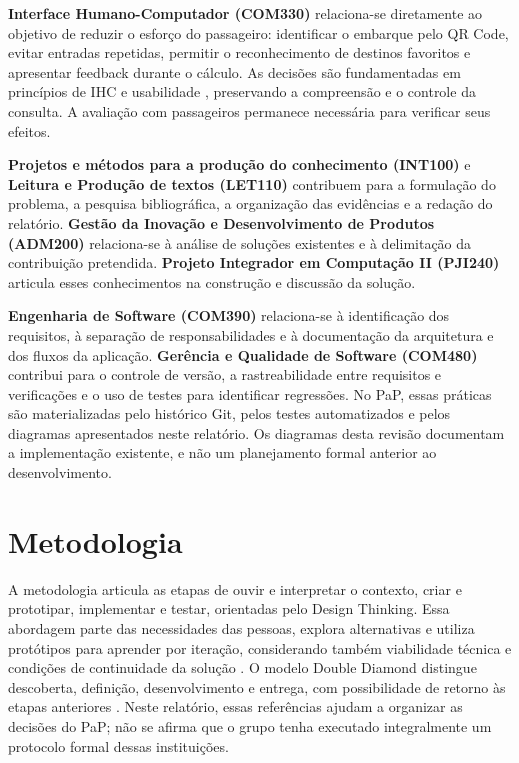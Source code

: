 \documentclass[12pt,oneside,a4paper,brazil,chapter=TITLE]{abntex2}
\let\papsection\section
\renewcommand{\section}{\clearpage\papsection}
\begin{document}
\textbf{Interface Humano-Computador (COM330)} relaciona-se diretamente ao objetivo de reduzir o esforço do passageiro: identificar o embarque pelo QR Code, evitar entradas repetidas, permitir o reconhecimento de destinos favoritos e apresentar feedback durante o cálculo. As decisões são fundamentadas em princípios de IHC e usabilidade \citep{barbosa2021,nielsen1994,iso924111}, preservando a compreensão e o controle da consulta. A avaliação com passageiros permanece necessária para verificar seus efeitos.

\textbf{Projetos e métodos para a produção do conhecimento (INT100)} e \textbf{Leitura e Produção de textos (LET110)} contribuem para a formulação do problema, a pesquisa bibliográfica, a organização das evidências e a redação do relatório. \textbf{Gestão da Inovação e Desenvolvimento de Produtos (ADM200)} relaciona-se à análise de soluções existentes e à delimitação da contribuição pretendida. \textbf{Projeto Integrador em Computação II (PJI240)} articula esses conhecimentos na construção e discussão da solução.

\textbf{Engenharia de Software (COM390)} relaciona-se à identificação dos requisitos, à separação de responsabilidades e à documentação da arquitetura e dos fluxos da aplicação. \textbf{Gerência e Qualidade de Software (COM480)} contribui para o controle de versão, a rastreabilidade entre requisitos e verificações e o uso de testes para identificar regressões. No PaP, essas práticas são materializadas pelo histórico Git, pelos testes automatizados e pelos diagramas apresentados neste relatório. Os diagramas desta revisão documentam a implementação existente, e não um planejamento formal anterior ao desenvolvimento.

\section{Metodologia}
A metodologia articula as etapas de ouvir e interpretar o contexto, criar e prototipar, implementar e testar, orientadas pelo Design Thinking. Essa abordagem parte das necessidades das pessoas, explora alternativas e utiliza protótipos para aprender por iteração, considerando também viabilidade técnica e condições de continuidade da solução \citep{ideo-designthinking}. O modelo Double Diamond distingue descoberta, definição, desenvolvimento e entrega, com possibilidade de retorno às etapas anteriores \citep{designcouncil}. Neste relatório, essas referências ajudam a organizar as decisões do PaP; não se afirma que o grupo tenha executado integralmente um protocolo formal dessas instituições.
\end{document}
